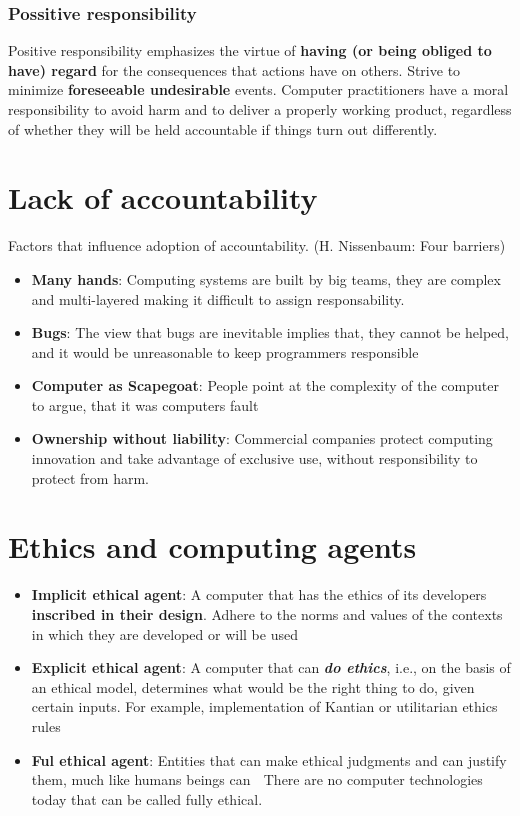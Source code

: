 \documentclass{article}
\begin{document}
\subsubsection{Possitive responsibility}
\begin{flushleft}
Positive responsibility emphasizes the virtue of \textbf{having (or being obliged to have) regard} for the consequences that actions have on others. Strive to minimize \textbf{foreseeable undesirable} events. Computer practitioners have a moral responsibility to avoid harm and to deliver a properly working product, regardless of whether they will be held accountable if things turn out differently.
\end{flushleft}

\section{Lack of accountability}

\begin{flushleft}
Factors that influence adoption of accountability. (H. Nissenbaum: Four barriers)
\begin{itemize}
  \item \textbf{Many hands}: Computing systems are built by big teams, they are complex and multi-layered making it difficult to assign responsability.
  \item \textbf{Bugs}: The view that bugs are inevitable implies that, they cannot be helped, and it would be unreasonable to keep programmers responsible
  \item \textbf{Computer as Scapegoat}: People point at the complexity of the computer to argue, that it was computers fault
  \item \textbf{Ownership without liability}: Commercial companies protect computing innovation and take advantage of exclusive use, without responsibility to protect from harm.
\end{itemize}
\end{flushleft}

\section{Ethics and computing agents}
\begin{itemize}
  \item \textbf{Implicit ethical agent}: A computer that has the ethics of its developers \textbf{inscribed in their design}. Adhere to the norms and values of the contexts in which they are developed or will be used
  \item \textbf{Explicit ethical agent}: A computer that can \textit{\textbf{do ethics}}, i.e., on the basis of an ethical model, determines what would be the right thing to do, given certain inputs. For example, implementation of Kantian or utilitarian ethics rules
  \item \textbf{Ful ethical agent}: Entities that can make ethical judgments and can justify them, much like humans beings can  There are no computer technologies today that can be called fully ethical.
\end{itemize}
\end{document}
